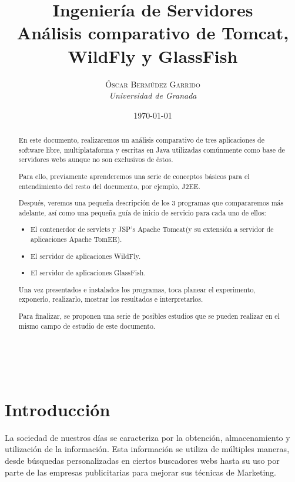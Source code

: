 \documentclass[a4paper, 10pt]{article}
\title{\textbf{Ingeniería de Servidores}\\ %
Análisis comparativo de Tomcat, WildFly y GlassFish} %
\author{\textsc{Óscar Bermúdez Garrido} %
\\
{\textit{Universidad de Granada}}} %
\date{\today} %
\makeatletter
\renewcommand{\maketitle}{
  \begin{flushright} %
  
  {\LARGE\@title} %
  
  \vspace{50pt} %
  
  {\large\@author} %
  \\\@date %
  \vspace{40pt} %
  \end{flushright}
}
\makeatother
\begin{document}
\maketitle %

\renewcommand{\abstractname}{Resumen} %
\begin{abstract}
	 En este documento, realizaremos un análisis comparativo de tres aplicaciones
	 de software libre, multiplataforma y escritas en Java utilizadas comúnmente
	 como base de servidores webs aunque no son exclusivos de éstos.
	 
	 Para ello, previamente aprenderemos una serie de conceptos básicos para el
	 entendimiento del resto del documento, por ejemplo, J2EE.
	 
	 Después, veremos una pequeña descripción de los 3 programas que compararemos
	 más adelante, así como una pequeña guía de inicio de servicio para cada uno
	 de ellos:
	 
	 \begin{itemize}
	 	\item El contenerdor de servlets y JSP's Apache Tomcat(y su extensión a 
	 	servidor de aplicaciones Apache TomEE).
	 	\item El servidor de aplicaciones WildFly.
	 	\item El servidor de aplicaciones GlassFish.
	 \end{itemize}
	 
	 Una vez presentados e instalados los programas, toca planear el experimento,
	 exponerlo, realizarlo, mostrar los resultados e interpretarlos.
	 
	 Para finalizar, se proponen una serie de posibles estudios que se pueden
	 realizar en el mismo campo de estudio de este documento.
\end{abstract}

{\parskip=2pt
  \tableofcontents
}
\pagebreak


\section{Introducción}
	La sociedad de nuestros días se caracteriza por la obtención, almacenamiento y
	utilización de la información. Esta información se utiliza de múltiples maneras,
	desde búsquedas personalizadas en ciertos buscadores webs hasta su uso por parte
	de las empresas publicitarias para mejorar sus técnicas de Marketing.
	
\end{document}
